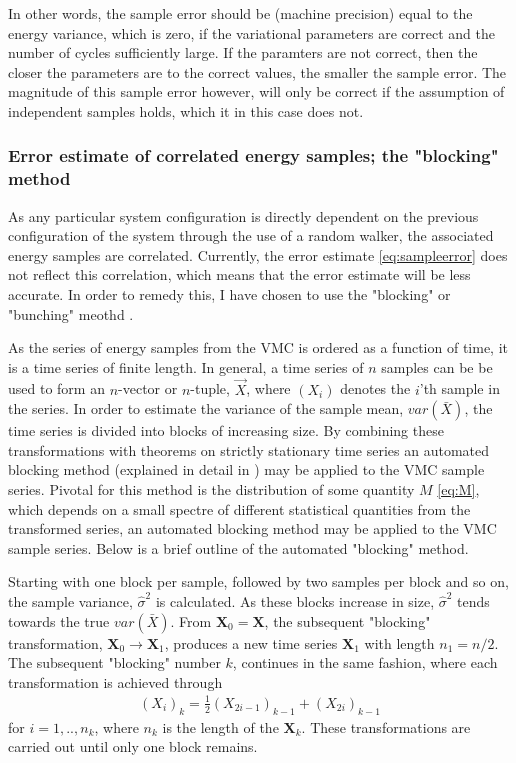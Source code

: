 \documentclass[%
oneside,                 %
final,                   %
10pt]{article}
\begin{document}
In other words, the sample error should be (machine precision) equal to the energy variance, which is zero, if the variational parameters are correct and the number of cycles sufficiently large. If the paramters are not correct, then the closer the parameters are to the correct values, the smaller the sample error. The magnitude of this sample error however, will only be correct if the assumption of independent samples holds, which it in this case does not.

\subsubsection{Error estimate of correlated energy samples; the "blocking" method} 
As any particular system configuration is directly dependent on the previous configuration of the system through the use of a random walker, the associated energy samples are correlated. Currently, the error estimate \eqref{eq:sampleerror} does not reflect this correlation, which means that the error estimate will be less accurate. In order to remedy this, I have chosen to use the "blocking" or "bunching" meothd \cite {flyvebjerg}. 

As the series of energy samples from the VMC is ordered as a function of time, it is a time series of finite length. In general, a time series of $n$ samples can be be used to form an $n$-vector or $n$-tuple, $\vec X$, where $(X_i)$ denotes the $i$'th sample in the series. In order to estimate the variance of the sample mean, $var (\bar X)$, the time series is divided into blocks of increasing size. By combining these transformations with theorems on strictly stationary time series an automated blocking method (explained in detail in \cite{Jonsson}) may be applied to the VMC sample series. Pivotal for this method is the distribution of some quantity $M$ \eqref{eq:M}, which depends on a small spectre of different statistical quantities from the transformed series, an automated blocking method \cite{Jonsson} may be applied to the VMC sample series. Below is a brief outline of the automated "blocking" method.

Starting with one block per sample, followed by two samples per block and so on, the sample variance, $\hat \sigma^2$ is calculated. As these blocks increase in size, $\hat \sigma^2$ tends towards the true $var(\bar X)$. From $\bm X_0=\bm X$, the subsequent "blocking" transformation, $\bm X_0 \rightarrow \bm X_1$, produces a new time series $\bm X_1$ with length $n_1=n/2$. The subsequent "blocking" number $k$, continues in the same fashion, where each transformation is achieved through 
\begin{align}
(X_i)_k=\frac{1}{2} (X_{2i-1})_{k-1} + (X_{2i})_{k-1}
\end{align}
for $i=1,..,n_k$, where $n_k$ is the length of the $\bm X_k$. These transformations are carried out until only one block remains. 
\end{document}
